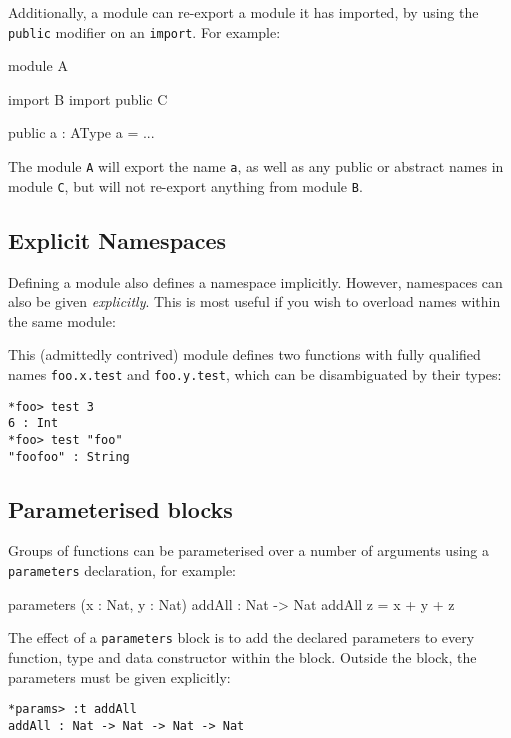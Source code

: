 Additionally, a module can re-export a module it has imported, by using the
\texttt{public} modifier on an \texttt{import}. For example:

\begin{code}
module A

import B
import public C

public a : AType
a = ...
\end{code}

\noindent
The module \texttt{A} will export the name \texttt{a}, as well as any
public or abstract names in module \texttt{C}, but will not re-export
anything from module \texttt{B}.

\subsection{Explicit Namespaces}

Defining a module also defines a namespace implicitly.
However, namespaces can also be given \emph{explicitly}.
This is most useful if you wish to overload names within the same module:


\noindent
This (admittedly contrived) module defines two functions with fully qualified names
\texttt{foo.x.test} and \texttt{foo.y.test}, which can be disambiguated by their types:

\begin{lstlisting}[style=stdout]
*foo> test 3 
6 : Int
*foo> test "foo" 
"foofoo" : String
\end{lstlisting}

\subsection{Parameterised blocks}

Groups of functions can be parameterised over a number of arguments using a \texttt{parameters} declaration, for example:

\begin{code}
parameters (x : Nat, y : Nat)
    addAll : Nat -> Nat
    addAll z = x + y + z
\end{code}

\noindent
The effect of a \texttt{parameters} block is to add the declared parameters to every function, type and data constructor within the block.
Outside the block, the parameters must be given explicitly:

\begin{lstlisting}[style=stdout]
*params> :t addAll
addAll : Nat -> Nat -> Nat -> Nat
\end{lstlisting}

